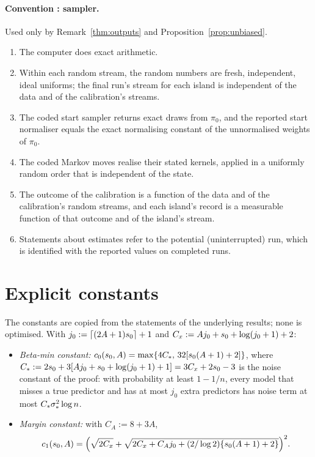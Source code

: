\paragraph{Convention : sampler.} Used only by Remark~\ref{thm:outputs} and Proposition~\ref{prop:unbiased}.
\begin{enumerate}[label=(\roman*),leftmargin=2em,itemsep=1pt]
  \item The computer does exact arithmetic.
  \item Within each random stream, the random numbers are fresh, independent, ideal uniforms; the final run's stream for
    each island is independent of the data and of the calibration's streams.
  \item The coded start sampler returns exact draws from $\pi_0$, and the reported start normaliser equals the exact
    normalising constant of the unnormalised weights of $\pi_0$.
  \item The coded Markov moves realise their stated kernels, applied in a uniformly random order that is independent of
    the state.
  \item The outcome of the calibration is a function of the data and of the calibration's random streams, and each island's
    record is a measurable function of that outcome and of the island's stream.
  \item Statements about estimates refer to the potential (uninterrupted) run, which is identified with the reported
    values on completed runs.
\end{enumerate}


\section{Explicit constants}\label{app:constants}

The constants are copied from the statements of the underlying results; none is optimised. With
$j_0:=\lceil(2A+1)s_0\rceil+1$ and $C_x:=Aj_0+s_0+\log(j_0+1)+2$:
\begin{itemize}[leftmargin=1.5em]
  \item \emph{Beta-min constant:} $c_0(s_0,A)=\max\{4C_*,\,32[s_0(A+1)+2]\}$, where
    $C_*:=2s_0+3[Aj_0+s_0+\log(j_0+1)+1]=3C_x+2s_0-3$ is the noise constant of the proof: with probability at least
    $1-1/n$, every model that misses a true predictor and has at most $j_0$ extra predictors has noise term at most
    $C_*\sigma_*^2\log n$.
  \item \emph{Margin constant:} with $C_A:=8+3A$,
    \[
      c_1(s_0,A)=\Big(\sqrt{2C_x}+\sqrt{2C_x+C_Aj_0+(2/\log2)\{s_0(A+1)+2\}}\Big)^2 .
    \]
\end{itemize}


